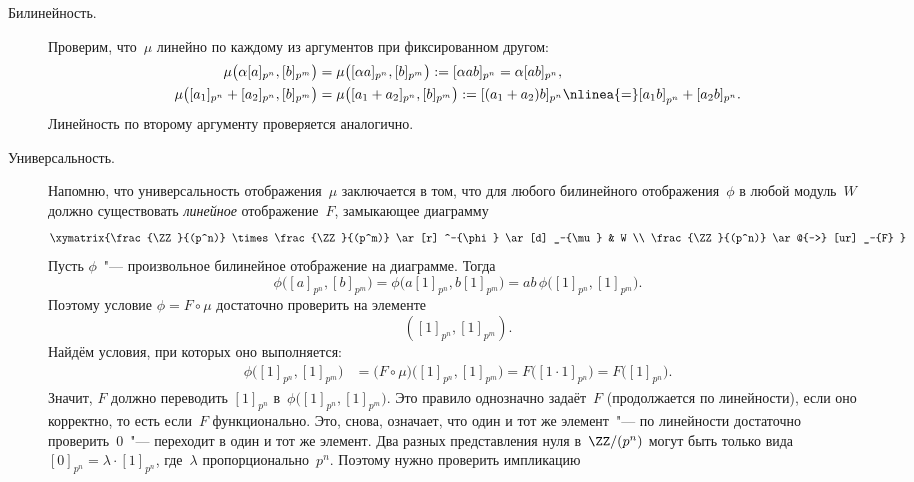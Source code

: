 \begin{proofm}
\begin{description}
		\item[Билинейность.] Проверим, что~$\mu$ линейно по каждому из аргументов при фиксированном другом:
			\begin{align*}
				\mu
				\bigl(
					\alpha [a]_{p^n}
					,
					[b]_{p^m}
				\bigr)
				&=
				\mu
				\bigl(
					[\alpha a]_{p^n}
					,
					[b]_{p^m}
				\bigr)
				:=
				[\alpha ab]_{p^n}
				=
				\alpha [ab]_{p^n},
				\\
				\mu
				\bigl(
					[a_1]_{p^n} + [a_2]_{p^n}
					,
					[b]_{p^m}
				\bigr)
				&=
				\mu
				\bigl(
					[a_1 + a_2]_{p^n}
					,
					[b]_{p^m}
				\bigr)
				:=
				[(a_1 + a_2)b]_{p^n}
				\nlinea{=}
				[a_1b]_{p^n} +
				[a_2b]_{p^n}.
			\end{align*}
			Линейность по второму аргументу проверяется аналогично.
		\item[Универсальность.] Напомню, что универсальность отображения~$\mu$ заключается в том, что для любого билинейного отображения~$\phi$ в любой модуль~$W$ должно существовать \emph{линейное} отображение~$F$, замыкающее диаграмму
			\[
				\xymatrix{%
					\frac{\ZZ}{(p^n)}
					\times
					\frac{\ZZ}{(p^m)}
					\ar [r] ^-{\phi}
					\ar [d] _-{\mu}
					&
					W
					\\
					\frac{\ZZ}{(p^n)}
					\ar @{-->} [ur] _-{F}
				}
			\]
			Пусть $\phi$~"--- произвольное билинейное отображение на диаграмме. Тогда
			\[
				\phi
				\bigl(
					[a]_{p^n},
					[b]_{p^m}
				\bigr)
				=
				\phi
				\bigl(
					a[1]_{p^n},
					b[1]_{p^m}
				\bigr)
				=
				ab\,
				\phi
				\bigl(
					[1]_{p^n},
					[1]_{p^m}
				\bigr)
				.
			\]
			Поэтому условие $\phi = F \circ \mu$ достаточно проверить на элементе
			\[
				([1]_{p^n}, [1]_{p^m})
				.
			\]
			Найдём условия, при которых оно выполняется:
			\begin{align*}
				\phi
				\bigl(
					[1]_{p^n},
					[1]_{p^m}
				\bigr)
				&=
				\bigl(
					F \circ \mu
				\bigr)
				\bigl(
					[1]_{p^n},
					[1]_{p^m}
				\bigr)
				=
				F
				\bigl(
					[1 \cdot 1]_{p^n}
				\bigr)
				=
				F
				\bigl(
					[1]_{p^n}
				\bigr)
				.
			\end{align*}
			Значит, $F$ должно переводить $[1]_{p^n}$
			в~$
				\phi
				\bigl(
					[1]_{p^n},
					[1]_{p^m}
				\bigr)
			$.
			Это правило однозначно задаёт~$F$ (продолжается по линейности), если оно корректно, то есть если~$F$ функционально. Это, снова, означает, что один и тот же элемент~"--- по линейности достаточно проверить~$0$~"--- переходит в один и тот же элемент. Два разных представления нуля в~$\ZZ/(p^n)$ могут быть только вида~$[0]_{p^n} = \lambda \cdot [1]_{p^n}$, где~$\lambda$ пропорционально~$p^n$. Поэтому нужно проверить импликацию

\end{description}
\end{proofm}
